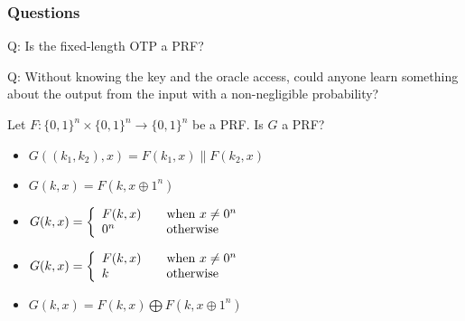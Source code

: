 \begin{frame}\frametitle{Questions}
\begin{exampleblock}{Q: Is the fixed-length OTP a PRF?}\end{exampleblock}
\begin{exampleblock}{Q: Without knowing the key and the oracle access, could anyone learn something about the output from the input with a non-negligible probability?} 
\end{exampleblock}
\begin{exampleblock}{Let $F: \{0,1\}^{n} \times \{0,1\}^{n} \to \{0,1\}^{n}$ be a PRF. Is $G$ a PRF?}
\begin{itemize}
\item $G((k_{1},k_{2}), x) = F(k_{1},x) \| F(k_{2},x)$
\item $G(k,x) = F(k, x\oplus 1^{n})$
\item $ G(k,x) = \left\{ 
  \begin{array}{l l}
    F(k,x) & \quad \text{when}\ x \neq 0^{n}\\
    0^{n} & \quad \text{otherwise}\\
  \end{array} \right. $
\item $ G(k,x) = \left\{ 
  \begin{array}{l l}
    F(k,x) & \quad \text{when}\ x \neq 0^{n}\\
    k & \quad \text{otherwise}\\
  \end{array} \right. $
\item $G(k,x) = F(k,x)\bigoplus F(k, x\oplus 1^{n})$
\end{itemize}
\end{exampleblock}
\end{frame}
